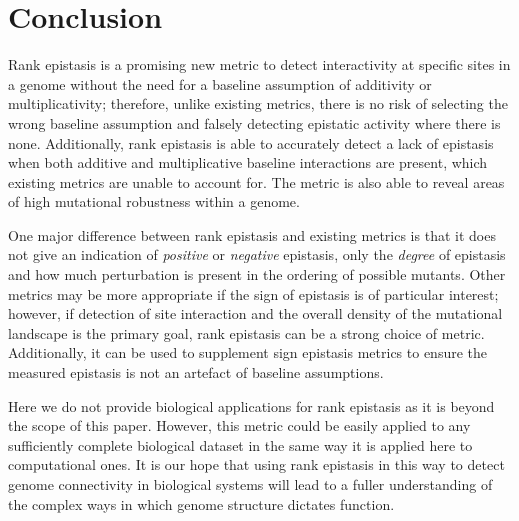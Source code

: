 \section{Conclusion}

Rank epistasis is a promising new metric to detect interactivity at specific sites in a genome without the need for a baseline assumption of additivity or multiplicativity; therefore, unlike existing metrics, there is no risk of selecting the wrong baseline assumption and falsely detecting epistatic activity where there is none. Additionally, rank epistasis is able to accurately detect a lack of epistasis when both additive and multiplicative baseline interactions are present, which existing metrics are unable to account for. The metric is also able to reveal areas of high mutational robustness within a genome.

One major difference between rank epistasis and existing metrics is that it does not give an indication of \textit{positive} or \textit{negative} epistasis, only the \textit{degree} of epistasis and how much perturbation is present in the ordering of possible mutants. Other metrics may be more appropriate if the sign of epistasis is of particular interest; however, if detection of site interaction and the overall density of the mutational landscape is the primary goal, rank epistasis can be a strong choice of metric. Additionally, it can be used to supplement sign epistasis metrics to ensure the measured epistasis is not an artefact of baseline assumptions.

 Here we do not provide biological applications for rank epistasis as it is beyond the scope of this paper. However, this metric could be easily applied to any sufficiently complete biological dataset in the same way it is applied here to computational ones. It is our hope that using rank epistasis in this way to detect genome connectivity in biological systems will lead to a fuller understanding of the complex ways in which genome structure dictates function.